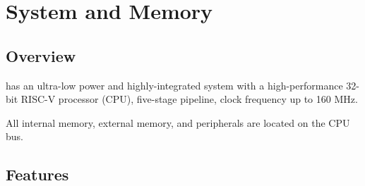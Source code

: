 \documentclass[main\_\_EN.tex]{subfiles}
\begin{document}

\ifglobal
\else
    \listoftodos
    {\let\clearpage\relax \listofdonetodos}
    \tableofcontents
\fi



\hypertarget{sysmem}{}
\chapter{System and Memory}
\label{mod:sysmem}

\section{Overview}

\chipname{} has an ultra-low power and highly-integrated system with a high-performance 32-bit RISC-V processor (CPU), five-stage pipeline, clock frequency up to 160 MHz.

All internal memory, external memory, and peripherals are located on the CPU bus.

\section{Features}
\end{document}
